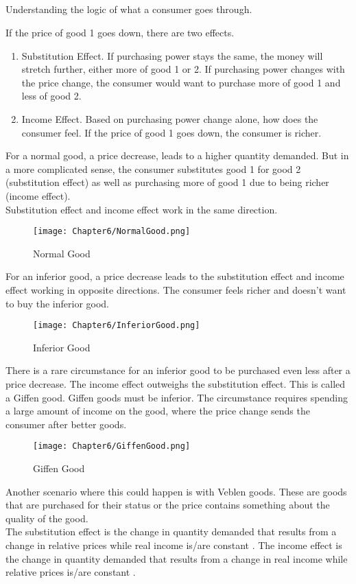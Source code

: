 \subsection{}
Understanding the logic of what a consumer goes through.
\par
If the price of good 1 goes down, there are two effects.
\begin{enumerate}
    \item Substitution Effect. If purchasing power stays the same, the money will stretch further, either more of good 1 or 2.
    If purchasing power changes with the price change, the consumer would want to purchase more of good 1 and less of good 2.
    \item Income Effect. Based on purchasing power change alone, how does the consumer feel. If the price of good 1 goes down, the consumer is richer.
\end{enumerate}
For a normal good, a price decrease, leads to a higher quantity demanded. But in a more complicated sense,
the consumer substitutes good 1 for good 2 (substitution effect) as well as purchasing more of good 1 due to being richer (income effect).\\
Substitution effect and income effect work in the same direction.
\begin{figure}[H]
    \centering
    \texttt{[image: Chapter6/NormalGood.png]}
    \caption{Normal Good}
    \label{fig:Normal_Good}
\end{figure}\par
For an inferior good, a price decrease leads to the substitution effect and income effect working in opposite directions.
The consumer feels richer and doesn't want to buy the inferior good.
\begin{figure}[H]
    \centering
    \texttt{[image: Chapter6/InferiorGood.png]}
    \caption{Inferior Good}
    \label{fig:Inferior_Good}
\end{figure}\par
There is a rare circumstance for an inferior good to be purchased even less after a price decrease.
The income effect outweighs the substitution effect. This is called a Giffen good. Giffen goods must be inferior. The circumstance
requires spending a large amount of income on the good, where the price change sends the consumer after better goods.
\begin{figure}[H]
    \centering
    \texttt{[image: Chapter6/GiffenGood.png]}
    \caption{Giffen Good}
    \label{fig:Giffen_Good}
\end{figure}\par
Another scenario where this could happen is with Veblen goods. These are goods that are purchased for their status or the 
price contains something about the quality of the good.\\
The substitution effect is the change in quantity demanded that results from a change in 
relative prices while 
real income is/are 
constant
. The income effect is the change in quantity demanded that results from a change in 
real income while 
relative prices
is/are 
constant
.